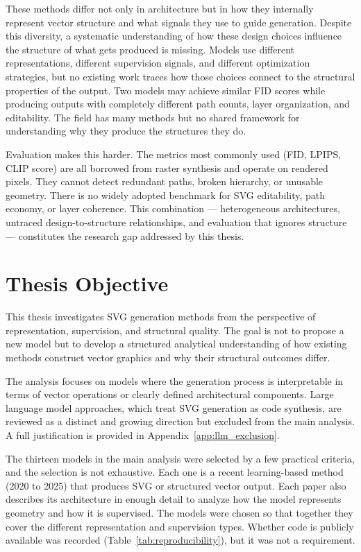 These methods differ not only in architecture but in how they internally 
represent vector structure and what signals they use to guide generation.
Despite this diversity, a systematic understanding of how these design 
choices influence the structure of what gets produced is missing. 
Models use different representations, different supervision signals, 
and different optimization strategies, but no existing work traces 
how those choices connect to the structural properties of the output. 
Two models may achieve similar FID scores while producing outputs with 
completely different path counts, layer organization, and editability. 
The field has many methods but no shared framework for understanding why 
they produce the structures they do.

Evaluation makes this harder. The metrics most commonly used 
(FID, LPIPS, CLIP score) are all borrowed from raster synthesis and 
operate on rendered pixels. They cannot detect redundant paths, broken 
hierarchy, or unusable geometry. There is no widely adopted benchmark 
for SVG editability, path economy, or layer coherence.
This combination --- heterogeneous architectures, 
untraced design-to-structure relationships, and evaluation that ignores 
structure --- constitutes the research gap addressed by this thesis.

\section{Thesis Objective}
\label{sec:objective}

This thesis investigates SVG generation methods from 
the perspective of representation, supervision, and 
structural quality. The goal is not to propose a new 
model but to develop a structured analytical 
understanding of how existing methods construct vector 
graphics and why their structural outcomes differ.

The analysis focuses on models where the generation 
process is interpretable in terms of vector operations 
or clearly defined architectural components. Large 
language model approaches, which treat SVG generation 
as code synthesis, are reviewed as a distinct and 
growing direction but excluded from the main analysis. 
A full justification is 
provided in Appendix~\ref{app:llm_exclusion}.

The thirteen models in the main analysis were selected 
by a few practical criteria, and the selection is not 
exhaustive. Each one is a recent learning-based method 
(2020 to 2025) that produces SVG or structured vector 
output. Each paper also describes its architecture in 
enough detail to analyze how the model represents 
geometry and how it is supervised. The models were 
chosen so that together they cover the different 
representation and supervision types. Whether code is 
publicly available was recorded 
(Table~\ref{tab:reproducibility}), but it was not a 
requirement.


